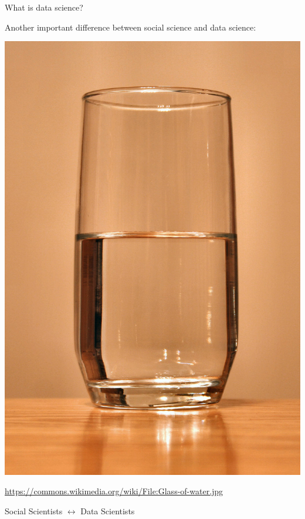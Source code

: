 \documentclass{beamer}
\def\vf{\vfill}
\begin{document}
\begin{frame}{What is data science?}

Another important difference between social science and data science:
\begin{center}
\includegraphics[height=0.7\textheight]{figures/glass-of-water.jpg}
\end{center}

\vf
\vspace{0.5in}
\tiny{\url{https://commons.wikimedia.org/wiki/File:Glass-of-water.jpg}}\\
\end{frame}
\begin{frame}

\begin{center}
\LARGE{Social Scientists $\longleftrightarrow$ Data Scientists}
\end{center}

\end{frame}



\end{document}
